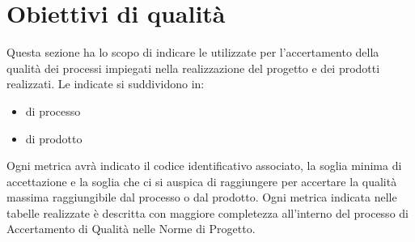 \section{Obiettivi di qualità}
\label{sec:obiettivi_qualità}
Questa sezione ha lo scopo di indicare le  utilizzate per l'accertamento della qualità dei processi impiegati nella realizzazione
del progetto e dei prodotti realizzati.
Le  indicate si suddividono in:
\begin{itemize}
    \item {} di processo
    \item {} di prodotto
\end{itemize} 
Ogni metrica avrà indicato il codice identificativo associato, la soglia minima di accettazione e la soglia che ci si auspica di raggiungere 
per accertare la qualità massima raggiungibile dal processo o dal prodotto.
Ogni metrica indicata nelle tabelle realizzate è descritta con maggiore completezza all'interno del processo di Accertamento di Qualità nelle Norme di Progetto.






